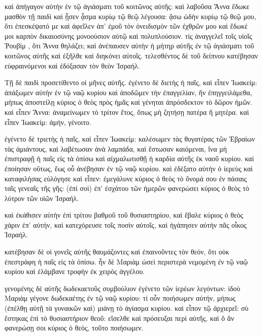 \pend\pstart
καὶ ἀπήγαγον αὐτὴν ἐν τῷ ἁγιάσματι τοῦ κοιτῶνος αὐτῆς: καὶ λαβοῦσα Ἄννα ἔδωκε μασθὸν τῇ παιδὶ καὶ ᾖσεν ᾆσμα κυρίῳ τῷ θεῷ λέγουσα: ᾄσω ὠδὴν κυρίῳ τῷ θεῷ μου, ὅτι ἐπεσκέψατό με καὶ ἀφεῖλεν ἀπ' ἐμοῦ τὸν ὀνειδισμὸν τῶν ἐχθρῶν μου καὶ ἔδωκέ μοι καρπὸν δικαιοσύνης μονοούσιον αὐτῷ καὶ πολυπλούσιον. τίς ἀναγγελεῖ τοῖς υἱοῖς Ῥουβίμ , ὅτι Ἄννα θηλάζει; καὶ ἀνέπαυσεν αὐτὴν ἡ μήτηρ αὐτῆς ἐν τῷ ἁγιάσματι τοῦ κοιτῶνος αὐτῆς καὶ ἐξῆλθε καὶ διηκόνει αὐτοῖς. τελεσθέντος δὲ τοῦ δείπνου κατέβησαν εὐφραινόμενοι καὶ ἐδόξασαν τὸν θεὸν Ἰσραήλ.

\pend\pstart
{}

\pend\setcounter{pstartL}{1}\pstart
Τῇ δὲ παιδὶ προσετίθεντο οἱ μῆνες αὐτῆς. ἐγένετο δὲ διετὴς ἡ παῖς, καὶ εἶπεν Ἰωακείμ: ἀπάξωμεν αὐτὴν ἐν τῷ ναῷ κυρίου καὶ ἀποδῶμεν τὴν ἐπαγγελίαν, ἥν ἐπηγγειλάμεθα, μήπως ἀποστείλῃ κύριος ὁ θεὸς πρὸς ἡμᾶς καὶ γένηται ἀπρόσδεκτον τὸ δῶρον ἡμῶν. καὶ εἶπεν Ἄννα: ἀναμείνωμεν τὸ τρίτον ἔτος, ὅπως μὴ ζητήσῃ πατέρα ἤ μητέρα. καὶ εἶπεν Ἰωακείμ: ἀμήν, γένοιτο.

\pend\pstart
ἐγένετο δὲ τριετὴς ἡ παῖς, καὶ εἶπεν Ἰωακείμ: καλέσωμεν τὰς θυγατέρας τῶν Ἑβραίων τὰς ἀμιάντους, καὶ λαβέτωσαν ἀνὰ λαμπάδα, καὶ ἔστωσαν καιόμεναι, ἵνα μὴ ἐπιστραφῇ ἡ παῖς εἰς τὰ ὀπίσω καὶ αἰχμαλωτισθῇ ἡ καρδία αὐτῆς ἐκ ναοῦ κυρίου. καὶ ἐποίησαν οὕτως, ἕως οὗ ἀνέβησαν ἐν τῷ ναῷ κυρίου. καὶ ἐδέξατο αὐτὴν ὁ ἱερεὺς καὶ καταφιλήσας εὐλόγησε καὶ εἶπεν: ἐμεγάλυνε κύριος ὁ θεὸς τὸ ὄνομά σου ἐν πάσαις ταῖς γενεαῖς τῆς γῆς: (ἐπὶ σοὶ) ἐπ' ἐσχάτου τῶν ἡμερῶν φανερώσει κύριος ὁ θεὸς τὸ λύτρον τῶν υἱῶν Ἰσραήλ.

\pend\pstart
καὶ ἐκάθισεν αὐτὴν ἐπὶ τρίτου βαθμοῦ τοῦ θυσιαστηρίου, καὶ ἔβαλε κύριος ὁ θεὸς χάριν ἐπ' αὐτήν, καὶ κατεχόρευσε τοῖς ποσὶν αὐτοῖς, καὶ ἠγάπησεν αὐτὴν πᾶς οἶκος Ἰσραήλ.

\pend\pstart
{}

\pend\setcounter{pstartL}{1}\pstart
κατέβησαν δὲ οἱ γονεῖς αὐτῆς θαυμάζοντες καὶ ἐπαινοῦντες τὸν θεόν, ὅτι οὐκ ἐπεστράφη ἡ παῖς εἰς τὰ ὀπίσω. ἦν δὲ Μαριὰμ ὡσεὶ περιστερὰ νεμομένη ἐν τῷ ναῷ κυρίου καὶ ἐλάμβανε τροφὴν ἐκ χειρὸς ἀγγέλου.

\pend\pstart
γενομένης δὲ αὐτῆς δωδεκαετοῦς συμβούλιον ἐγένετο τῶν ἱερέων λεγόντων: ἰδοὺ Μαριὰμ γέγονε δωδεκαέτης ἐν τῷ ναῷ κυρίου: τί οὖν ποιήσωμεν αὐτήν, μήπως (ἐπέλθῃ αὐτῇ τὰ γυναικῶν καὶ) μιάνῃ τὸ ἁγίασμα κυρίου. καὶ εἶπον τῷ ἀρχιερεῖ: σὺ ἕστηκας ἐπὶ τὸ θυσιαστήριον θεοῦ: εἴσελθε καὶ πρόσευξαι περὶ αὐτῆς, καὶ ὅ ἄν φανερώσῃ σοι κύριος ὁ θεός, τοῦτο ποιήσωμεν.

